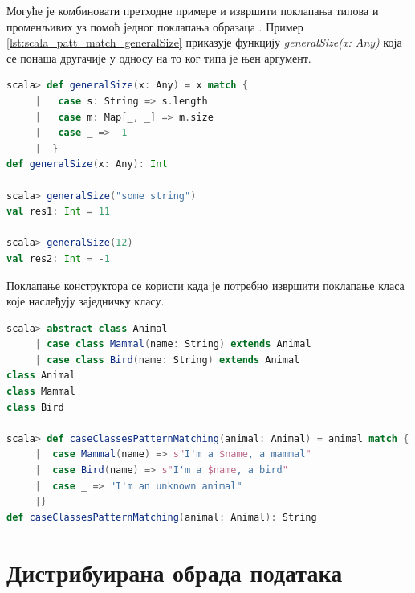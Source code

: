 \documentclass[12pt,oneside]{memoir}
\begin{document}
Могуће је комбиновати претходне примере и извршити поклапања типова и променљивих уз помоћ једног поклапања образаца \cite{scala_prog}. Пример \ref{lst:scala_patt_match_generalSize} приказује функцију \textit{generalSize(x: Any)} која се понаша другачије у односу на то ког типа је њен аргумент.

\begin{lstlisting}[language=Scala, caption={Пример поклапања типова и променљивих}, label={lst:scala_patt_match_generalSize}]
scala> def generalSize(x: Any) = x match {
     |   case s: String => s.length
     |   case m: Map[_, _] => m.size
     |   case _ => -1
     |  }
def generalSize(x: Any): Int

scala> generalSize("some string")
val res1: Int = 11

scala> generalSize(12)
val res2: Int = -1
\end{lstlisting}

Поклапање конструктора се користи када је потребно извршити поклапање класа које наслеђују заједничку класу. 

\begin{lstlisting}[language=Scala, caption={Поклапање конструктора}, label={lst:scala_patt_match_constr_match_example}]
scala> abstract class Animal
     | case class Mammal(name: String) extends Animal
     | case class Bird(name: String) extends Animal
class Animal
class Mammal
class Bird

scala> def caseClassesPatternMatching(animal: Animal) = animal match {
     |  case Mammal(name) => s"I'm a $name, a mammal"
     |  case Bird(name) => s"I'm a $name, a bird"
     |  case _ => "I'm an unknown animal"
     |}
def caseClassesPatternMatching(animal: Animal): String
\end{lstlisting}



\chapter{Дистрибуирана обрада података}
\label{chp:dist_sis}
\end{document}
